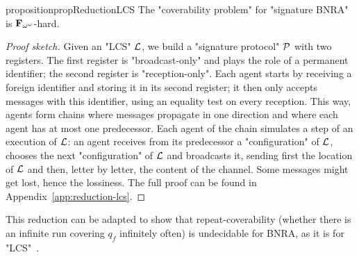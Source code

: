 \begin{restatable}{proposition}{propReductionLCS}
	\label{prop:reduction-LCS}
	The "coverability problem" for "signature BNRA" is $\mathbf{F}_{\omega^\omega}$-hard.
\end{restatable}
\begin{proof}[Proof sketch]
Given an "LCS" $\mathcal{L}$, we build a "signature protocol" $\mathcal{P}$ with two registers. The first register is "broadcast-only" and plays the role of a permanent identifier; the second register is "reception-only".
Each agent starts by receiving a foreign identifier and storing it in its second register; it then only accepts messages with this identifier, using an equality test on every reception.
 This way, agents form chains where messages propagate in one direction and where each agent has at most one predecessor. 
 Each agent of the chain simulates a step of an execution of $\mathcal{L}$: an agent receives from its predecessor a "configuration" of $\mathcal{L}$, chooses the next "configuration" of $\mathcal{L}$ and broadcasts it, sending first the location of $\mathcal{L}$ and then, letter by letter, the content of the channel. 
 Some messages might get lost, hence the lossiness. 
 The full proof can be found in Appendix~\ref{app:reduction-lcs}. 
\end{proof}



\begin{remark}
	This reduction can be adapted to show that repeat-coverability (whether there is an infinite run covering $q_f$ infinitely often) is undecidable for BNRA, as it is for "LCS"~\cite{AbdullaJ1996undec}. 
\end{remark}

